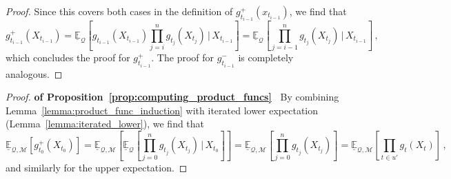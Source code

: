 \documentclass[twoside,11pt]{article}
\newcommand{\lexp}{\underline{\mathbb{E}}_{\rateset,\mathcal{M}}}
\newcommand{\rateset}{\mathcal{Q}}
\begin{document}
\begin{proof}
Since this covers both cases in the definition of $g_{t_{i-1}}^+(x_{t_{i-1}})$, we find that
\begin{equation*}
g_{t_{i-1}}^+(X_{t_{i-1}}) = \underline{\mathbb{E}}_{\rateset}\left[g_{t_{i-1}}(X_{t_{i-1}})\prod_{j=i}^{n}g_{t_j}(X_{t_j})\,\Bigg\vert\,X_{t_{i-1}}\right] = \underline{\mathbb{E}}_{\rateset}\left[\prod_{j={i-1}}^{n}g_{t_j}(X_{t_j})\,\Bigg\vert\,X_{t_{i-1}}\right]\,,
\end{equation*}
which concludes the proof for $g_{t_{i-1}}^+$. The proof for $g_{t_{i-1}}^-$ is completely analogous.
\end{proof}

\begin{proof}{\bf of Proposition~\ref{prop:computing_product_funcs}~}
By combining Lemma~\ref{lemma:product_func_induction} with iterated lower expectation (Lemma~\ref{lemma:iterated_lower}), we find that
\begin{equation*}
\lexp\left[g_{t_0}^+(X_{t_0})\right] = \lexp\left[\underline{\mathbb{E}}_{\rateset}\left[\prod_{j=0}^{n}g_{t_j}(X_{t_j})\,\Bigg\vert\,X_{t_0}\right]\right] = \lexp\left[\prod_{j=0}^{n}g_{t_j}(X_{t_j})\right] = \lexp\left[\prod_{t\in u'}g_{t}(X_{t})\right]\,,
\end{equation*}
and similarly for the upper expectation.
\end{proof}
\end{document}
